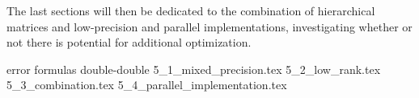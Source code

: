 The last sections will then be dedicated to the combination of hierarchical matrices and low-precision and parallel implementations, investigating whether or not there is potential for additional optimization.

error formulas
double-double
{5_1_mixed_precision.tex}
{5_2_low_rank.tex}
{5_3_combination.tex}
{5_4_parallel_implementation.tex}